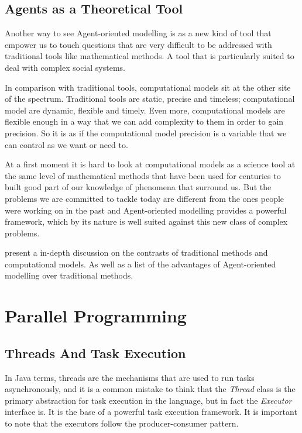 \subsection{Agents as a Theoretical Tool}

Another way to see Agent-oriented modelling is as a new kind of tool that empower us to touch questions that are very difficult to be addressed with traditional tools like mathematical methods. A tool that is particularly suited to deal with complex social systems.

In comparison with traditional tools, computational models sit at the other site of the spectrum. Traditional tools are static, precise and timeless; computational model are dynamic, flexible and timely. Even more, computational models are flexible enough in a way that we can add complexity to them in order to gain precision. So it is as if the computational model precision is a variable that we can control as we want or need to.

At a first moment it is hard to look at computational models as a science tool at the same level of mathematical methods that have been used for centuries to built good part of our knowledge of phenomena that surround us. But the problems we are committed to tackle today are different from the ones people were working on in the past and Agent-oriented modelling provides a powerful framework, which by its nature is well suited against this new class of complex problems.

\citeauthor{miller2007complex} present a in-depth discussion on the contrasts of traditional methods and computational models. As well as a list of the advantages of Agent-oriented modelling over traditional methods. 

\section{Parallel Programming}

\subsection{Threads And Task Execution}
\label{subsec:threads-task-exec}

In Java terms, threads are the mechanisms that are used to run tasks asynchronously, and it is a common mistake to think that the \emph{Thread} class is the primary abstraction for task execution in the language, but in fact the \emph{Executor} interface is. It is the base of a powerful task execution framework. It is important to note that the executors follow the producer-consumer pattern.

